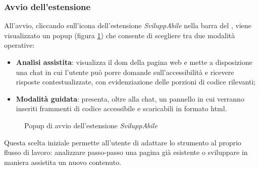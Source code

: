 \subsubsection{Avvio dell'estensione}
\noindent All’avvio, cliccando sull’icona dell’estensione \textit{SviluppAbile} nella barra del , viene visualizzato un popup (figura \ref{fig:popup}) che consente di scegliere tra due modalità operative:
\begin{itemize}
  \item \textbf{Analisi assistita}: visualizza il \acrshort{dom} della pagina web e mette a disposizione una chat in cui l’utente può porre domande sull’accessibilità e ricevere risposte contestualizzate, con evidenziazione delle porzioni di codice rilevanti; 
  \item \textbf{Modalità guidata}: presenta, oltre alla chat, un pannello in cui verranno inseriti frammenti di codice accessibile e scaricabili in formato \acrshort{html}.
\end{itemize}

\begin{figure}[H]
    \centering
    \caption{Popup di avvio dell'estensione \textit{SviluppAbile}}\label{fig:popup}
\end{figure}

\noindent Questa scelta iniziale permette all’utente di adattare lo strumento al proprio flusso di lavoro: analizzare passo-passo una pagina già esistente o sviluppare in maniera assistita un nuovo contenuto.

